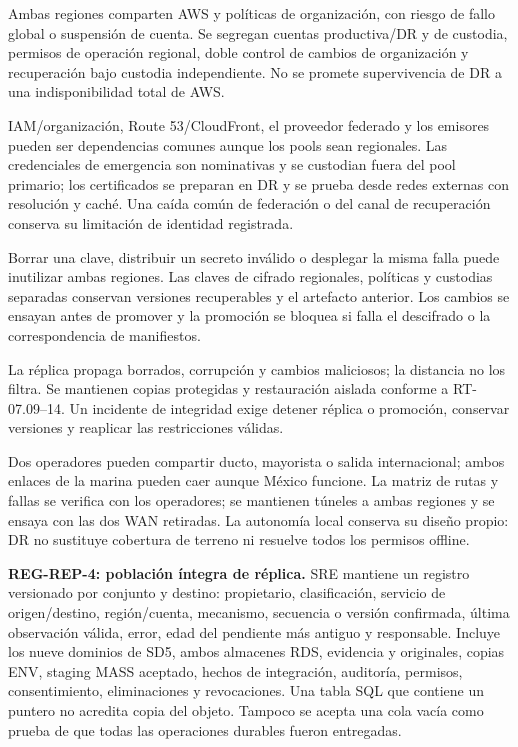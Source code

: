 Ambas regiones comparten AWS y políticas de organización, con riesgo de fallo global o suspensión de cuenta. Se segregan cuentas productiva/DR y de custodia, permisos de operación regional, doble control de cambios de organización y recuperación bajo custodia independiente. No se promete supervivencia de DR a una indisponibilidad total de AWS.

IAM/organización, Route 53/CloudFront, el proveedor federado y los emisores pueden ser dependencias comunes aunque los pools sean regionales. Las credenciales de emergencia son nominativas y se custodian fuera del pool primario; los certificados se preparan en DR y se prueba desde redes externas con resolución y caché. Una caída común de federación o del canal de recuperación conserva su limitación de identidad registrada.

Borrar una clave, distribuir un secreto inválido o desplegar la misma falla puede inutilizar ambas regiones. Las claves de cifrado regionales, políticas y custodias separadas conservan versiones recuperables y el artefacto anterior. Los cambios se ensayan antes de promover y la promoción se bloquea si falla el descifrado o la correspondencia de manifiestos.

La réplica propaga borrados, corrupción y cambios maliciosos; la distancia no los filtra. Se mantienen copias protegidas y restauración aislada conforme a RT-07.09--14. Un incidente de integridad exige detener réplica o promoción, conservar versiones y reaplicar las restricciones válidas.

Dos operadores pueden compartir ducto, mayorista o salida internacional; ambos enlaces de la marina pueden caer aunque México funcione. La matriz de rutas y fallas se verifica con los operadores; se mantienen túneles a ambas regiones y se ensaya con las dos WAN retiradas. La autonomía local conserva su diseño propio: DR no sustituye cobertura de terreno ni resuelve todos los permisos offline.


\textbf{REG-REP-4: población íntegra de réplica.}
\label{sec:sd4-dr-replicacion}
SRE mantiene un registro versionado por conjunto y destino: propietario, clasificación, servicio de origen/destino, región/cuenta, mecanismo, secuencia o versión confirmada, última observación válida, error, edad del pendiente más antiguo y responsable. Incluye los nueve dominios de SD5, ambos almacenes RDS, evidencia y originales, copias ENV, staging MASS aceptado, hechos de integración, auditoría, permisos, consentimiento, eliminaciones y revocaciones. Una tabla SQL que contiene un puntero no acredita copia del objeto. Tampoco se acepta una cola vacía como prueba de que todas las operaciones durables fueron entregadas.


